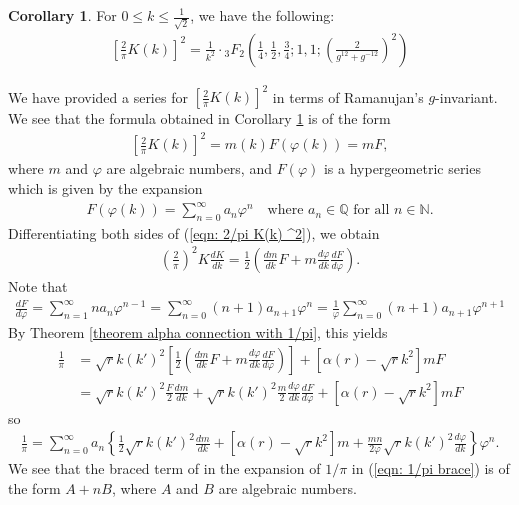 \documentclass[11pt]{amsart}
\theoremstyle{definition}
\numberwithin{theorem}{section}
\newtheorem{corollary}[theorem]{Corollary}
\begin{document}
\begin{corollary}\label{seriesforKintermsofhypergeometric}
For $0\le k\le \frac{1}{\sqrt{2}}$, we have the following:
\begin{align}\label{eqn: 2/pi K(k) ^2}
    \left[\frac{2}{\pi}K\left(k\right)\right]^2=\frac{1}{k^2}\cdot {_3F_2}\left(\frac{1}{4},\frac{1}{2},\frac{3}{4};1,1;\left(\frac{2}{g^{12}+g^{-12}}\right)^2\right)
\end{align}
\end{corollary}
We have provided a series for $\left[\frac{2}{\pi}K\left(k\right)\right]^2$ in terms of Ramanujan's $g$-invariant. We see that the formula obtained in Corollary \ref{seriesforKintermsofhypergeometric} is of the form \begin{align*}
    \left[\frac{2}{\pi}K\left(k\right)\right]^2=m\left(k\right)F\left(\varphi\left(k\right)\right)=mF,
\end{align*}
where $m$ and $\varphi$ are algebraic numbers, and $F\left(\varphi\right)$ is a hypergeometric series which is given by the expansion 
\begin{align*}
    F\left(\varphi\left(k\right)\right)=\sum_{n=0}^{\infty}a_n\varphi^n\quad\text{where }a_n\in\mathbb{Q}\text{ for all }n\in\mathbb{N}.
\end{align*}
Differentiating both sides of (\ref{eqn: 2/pi K(k) ^2}), we obtain 
\begin{align*}
    \left(\frac{2}{\pi}\right)^2 K\frac{dK}{dk}=\frac{1}{2}\left(\frac{dm}{dk}F+m\frac{d\varphi}{dk}\frac{dF}{d\varphi}\right).
\end{align*}
Note that 
\begin{align*}
    \frac{dF}{d\varphi}=\sum_{n=1}^{\infty}na_n\varphi^{n-1}=\sum_{n=0}^{\infty}\left(n+1\right)a_{n+1}\varphi^n=\frac{1}{\varphi}\sum_{n=0}^\infty \left(n+1\right)a_{n+1}\varphi^{n+1}
\end{align*}
By Theorem \ref{theorem alpha connection with 1/pi}, this yields 
\begin{align*}
  \frac{1}{\pi }&=\sqrt{r}k{{\left( {{k}'} \right)}^{2}}\left[ \frac{1}{2}\left( \frac{dm}{dk}F+m\frac{d\varphi }{dk}\frac{dF}{d\varphi } \right) \right]+\left[ \alpha \left( r \right)-\sqrt{r}{{k}^{2}} \right]mF \\ 
 & =\sqrt{r}k{{\left( {{k}'} \right)}^{2}}\frac{F}{2}\frac{dm}{dk}+\sqrt{r}k{{\left( {{k}'} \right)}^{2}}\frac{m}{2}\frac{d\varphi }{dk}\frac{dF}{d\varphi } +\left[ \alpha \left( r \right)-\sqrt{r}{{k}^{2}} \right]mF 
\end{align*}
so \begin{align}\label{eqn: 1/pi brace}
\frac{1}{\pi}=\sum\limits_{n=0}^{\infty }{{{a}_{n}}\left\{ \frac{1}{2}\sqrt{r}k{{\left( {{k}'} \right)}^{2}}\frac{dm}{dk}+\left[ \alpha \left( r \right)-\sqrt{r}{{k}^{2}} \right]m+\frac{mn}{2\varphi }\sqrt{r}k{{\left( {{k}'} \right)}^{2}}\frac{d\varphi }{dk} \right\}{{\varphi }^{n}}}.
\end{align}
We see that the braced term of in the expansion of $1/\pi$ in (\ref{eqn: 1/pi brace}) is of the form $A+nB$, where $A$ and $B$ are algebraic numbers.
\end{document}

